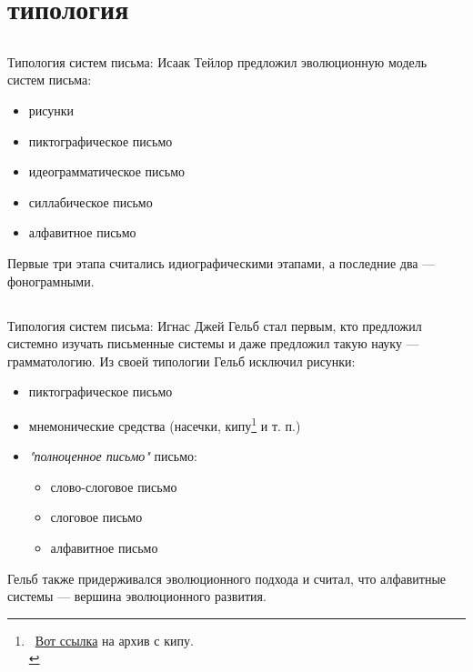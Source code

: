 \section{типология}
\subsection{\citep{taylor83}}
\begin{frame}{Типология систем письма: \citep{taylor83}}
Исаак Тейлор предложил эволюционную модель систем письма:
\begin{itemize}
\item рисунки
\item пиктографическое письмо
\item идеограмматическое письмо
\item силлабическое письмо
\item алфавитное письмо
\end{itemize}
Первые три этапа считались идиографическими этапами, а последние два — фонограмными.
\end{frame}
\subsection{\citep{gelb52}}
\begin{frame}{Типология систем письма: \citep{gelb52}}
Игнас Джей Гельб стал первым, кто предложил системно изучать письменные системы и даже предложил такую науку — грамматологию. Из своей типологии Гельб исключил рисунки:
\begin{itemize}
\item пиктографическое письмо
\item мнемонические средства (насечки, кипу\footnote[frame]{\ \href{http://khipukamayuq.fas.harvard.edu/}{Вот ссылка} на архив с кипу.\\} и т. п.)
\item \textit{"полноценное письмо"} письмо:
\begin{itemize}
\item слово-слоговое письмо
\item слоговое письмо
\item алфавитное письмо
\end{itemize}
\end{itemize}
Гельб также придерживался эволюционного подхода и считал, что алфавитные системы — вершина эволюционного развития.
\end{frame}
